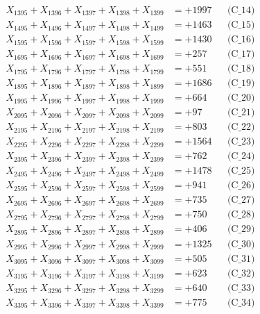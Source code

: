 \documentclass[a4paper,10pt]{article}
\begin{document}
{\begin{align}
X_{1395} + X_{1396} + X_{1397} + X_{1398} + X_{1399} &= +1997 && \text{(C\_14)} \\
X_{1495} + X_{1496} + X_{1497} + X_{1498} + X_{1499} &= +1463 && \text{(C\_15)} \\
\allowbreak
X_{1595} + X_{1596} + X_{1597} + X_{1598} + X_{1599} &= +1430 && \text{(C\_16)} \\
X_{1695} + X_{1696} + X_{1697} + X_{1698} + X_{1699} &= +257 && \text{(C\_17)} \\
X_{1795} + X_{1796} + X_{1797} + X_{1798} + X_{1799} &= +551 && \text{(C\_18)} \\
X_{1895} + X_{1896} + X_{1897} + X_{1898} + X_{1899} &= +1686 && \text{(C\_19)} \\
X_{1995} + X_{1996} + X_{1997} + X_{1998} + X_{1999} &= +664 && \text{(C\_20)} \\
\allowbreak
X_{2095} + X_{2096} + X_{2097} + X_{2098} + X_{2099} &= +97 && \text{(C\_21)} \\
X_{2195} + X_{2196} + X_{2197} + X_{2198} + X_{2199} &= +803 && \text{(C\_22)} \\
X_{2295} + X_{2296} + X_{2297} + X_{2298} + X_{2299} &= +1564 && \text{(C\_23)} \\
X_{2395} + X_{2396} + X_{2397} + X_{2398} + X_{2399} &= +762 && \text{(C\_24)} \\
X_{2495} + X_{2496} + X_{2497} + X_{2498} + X_{2499} &= +1478 && \text{(C\_25)} \\
\allowbreak
X_{2595} + X_{2596} + X_{2597} + X_{2598} + X_{2599} &= +941 && \text{(C\_26)} \\
X_{2695} + X_{2696} + X_{2697} + X_{2698} + X_{2699} &= +735 && \text{(C\_27)} \\
X_{2795} + X_{2796} + X_{2797} + X_{2798} + X_{2799} &= +750 && \text{(C\_28)} \\
X_{2895} + X_{2896} + X_{2897} + X_{2898} + X_{2899} &= +406 && \text{(C\_29)} \\
X_{2995} + X_{2996} + X_{2997} + X_{2998} + X_{2999} &= +1325 && \text{(C\_30)} \\
\allowbreak
X_{3095} + X_{3096} + X_{3097} + X_{3098} + X_{3099} &= +505 && \text{(C\_31)} \\
X_{3195} + X_{3196} + X_{3197} + X_{3198} + X_{3199} &= +623 && \text{(C\_32)} \\
X_{3295} + X_{3296} + X_{3297} + X_{3298} + X_{3299} &= +640 && \text{(C\_33)} \\
X_{3395} + X_{3396} + X_{3397} + X_{3398} + X_{3399} &= +775 && \text{(C\_34)} \\

\end{align}}
\end{document}
